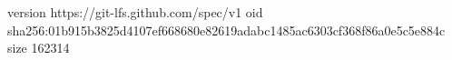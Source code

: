 version https://git-lfs.github.com/spec/v1
oid sha256:01b915b3825d4107ef668680e82619adabc1485ac6303cf368f86a0e5c5e884c
size 162314
